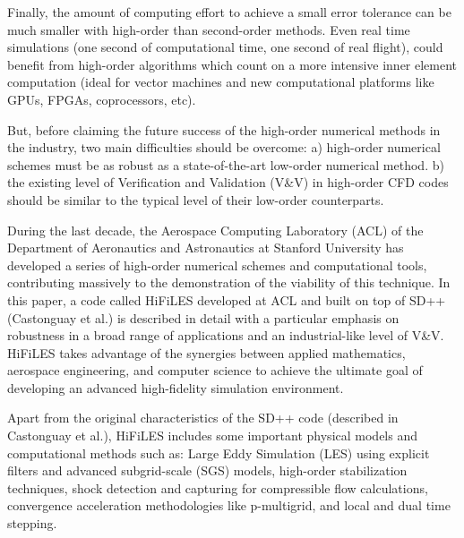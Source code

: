 Finally, the amount of computing effort to achieve a small error tolerance can be much smaller with high-order than second-order methods. Even real time simulations (one second of computational time, one second of real flight), could benefit from high-order algorithms which count on a more intensive inner element computation (ideal for vector machines and new computational platforms like GPUs, FPGAs, coprocessors, etc).

But, before claiming the future success of the high-order numerical methods in the industry, two main difficulties should be overcome: a) high-order numerical schemes must be as robust as a state-of-the-art low-order numerical method. b) the existing level of Verification and Validation (V\&V) in high-order CFD codes should be similar to the typical level of their low-order counterparts.

During the last decade, the Aerospace Computing Laboratory (ACL) of the Department of Aeronautics and Astronautics at Stanford University has developed a series of high-order numerical schemes and computational tools, contributing massively to the demonstration of the viability of this technique. In this paper, a code called HiFiLES developed at ACL and built on top of SD++ (Castonguay et al.\cite{castonguay2011}) is described in detail with a particular emphasis on robustness in a broad range of applications and an industrial-like level of V\&V. HiFiLES takes advantage of the synergies between applied mathematics, aerospace engineering, and computer science to achieve the ultimate goal of developing an advanced high-fidelity simulation environment.

Apart from the original characteristics of the SD++ code (described in Castonguay et al.\cite{castonguay2011}), HiFiLES includes some important physical models and computational methods such as: Large Eddy Simulation (LES) using explicit filters and advanced subgrid-scale (SGS) models, high-order stabilization techniques, shock detection and capturing for compressible flow calculations, convergence acceleration methodologies like p-multigrid, and local and dual time stepping.

